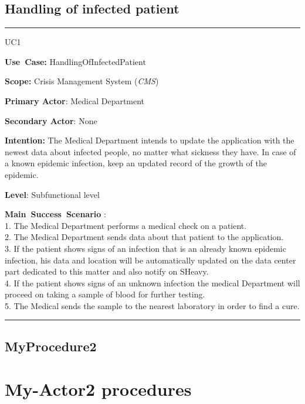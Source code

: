 \subsection{Handling of infected patient}
\vspace{0.5cm}
\hrule
\vspace{0.5cm}
\begin{lyxlist}{UC1}
\small{
\item [\textbf{Use~Case:}] HandlingOfInfectedPatient
\item [\textbf{Scope:}] Crisis Management System (\emph{CMS})
\item [\textbf{Primary Actor}:] Medical Department
\item [\textbf{Secondary Actor}:] None
\item [\textbf{Intention:}]The Medical Department intends to update
the application with the newest data about infected people, no matter what
sickness they have. In case of a known epidemic infection, keep an updated
record of the growth of the epidemic.
\item [\textbf{Level}:]Subfunctional level
\item [\textbf{Main~Success~Scenario}]:\\
1. The Medical Department performs a medical check on a patient.\\
2. The Medical Department sends data about that patient to the application.\\
3. If the patient shows signs of an infection that is an already known epidemic infection, his data
and location will be automatically updated on the data center part dedicated to
this matter and also notify on SHeavy.\\
4. If the patient shows signs of an unknown infection the medical Department
will proceed on taking a sample of blood for further testing.\\
5. The Medical sends the sample to the nearest laboratory in order to find a
cure.\\
}
\end{lyxlist}
\hrule
\vspace{0.5cm} 

\subsection{MyProcedure2}

\section{My-Actor2 procedures}
